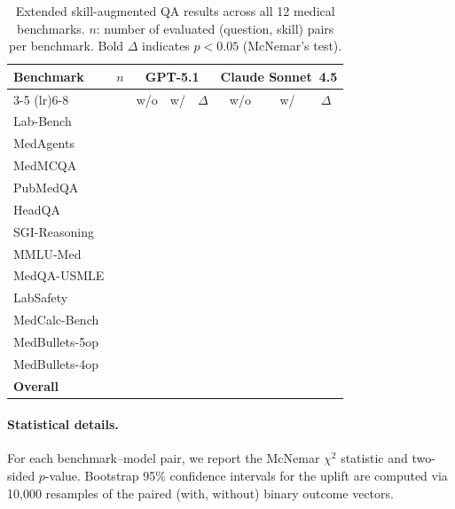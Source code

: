 \begin{table}[t]
\centering\small
\caption{Extended skill-augmented QA results across all 12 medical benchmarks. $n$: number of evaluated (question, skill) pairs per benchmark. Bold $\Delta$ indicates $p < 0.05$ (McNemar's test).}
\begin{tabular}{lrcccccc}
\toprule
\textbf{Benchmark} & \textbf{$n$} & \multicolumn{3}{c}{\textbf{GPT-5.1}} & \multicolumn{3}{c}{\textbf{Claude Sonnet~4.5}} \\
\cmidrule(lr){3-5} \cmidrule(lr){6-8}
 & & w/o & w/ & $\Delta$ & w/o & w/ & $\Delta$ \\
\midrule
Lab-Bench       & \todo{} & \todo{} & \todo{} & \todo{} & \todo{} & \todo{} & \todo{} \\
MedAgents       & \todo{} & \todo{} & \todo{} & \todo{} & \todo{} & \todo{} & \todo{} \\
MedMCQA         & \todo{} & \todo{} & \todo{} & \todo{} & \todo{} & \todo{} & \todo{} \\
PubMedQA        & \todo{} & \todo{} & \todo{} & \todo{} & \todo{} & \todo{} & \todo{} \\
HeadQA          & \todo{} & \todo{} & \todo{} & \todo{} & \todo{} & \todo{} & \todo{} \\
SGI-Reasoning   & \todo{} & \todo{} & \todo{} & \todo{} & \todo{} & \todo{} & \todo{} \\
MMLU-Med        & \todo{} & \todo{} & \todo{} & \todo{} & \todo{} & \todo{} & \todo{} \\
MedQA-USMLE     & \todo{} & \todo{} & \todo{} & \todo{} & \todo{} & \todo{} & \todo{} \\
LabSafety       & \todo{} & \todo{} & \todo{} & \todo{} & \todo{} & \todo{} & \todo{} \\
MedCalc-Bench   & \todo{} & \todo{} & \todo{} & \todo{} & \todo{} & \todo{} & \todo{} \\
MedBullets-5op  & \todo{} & \todo{} & \todo{} & \todo{} & \todo{} & \todo{} & \todo{} \\
MedBullets-4op  & \todo{} & \todo{} & \todo{} & \todo{} & \todo{} & \todo{} & \todo{} \\
\midrule
\textbf{Overall} & \todo{} & \todo{} & \todo{} & \todo{} & \todo{} & \todo{} & \todo{} \\
\bottomrule
\end{tabular}
\label{tab:ablation_full}
\end{table}

\paragraph{Statistical details.}
For each benchmark--model pair, we report the McNemar $\chi^2$ statistic and two-sided $p$-value.
Bootstrap 95\% confidence intervals for the uplift are computed via 10,000 resamples of the paired (with, without) binary outcome vectors.

